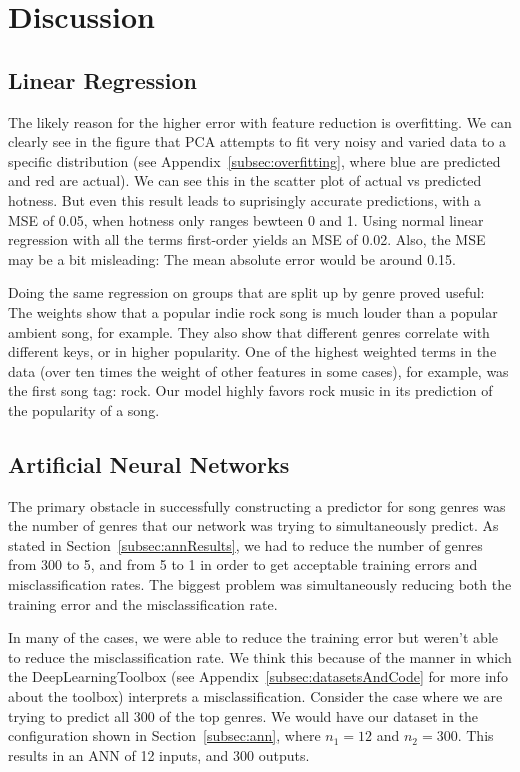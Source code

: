 \documentclass[12pt]{article}
\begin{document}
\section{Discussion}
\label{sec:discussion}

\subsection{Linear Regression}
\label{subsec:linearRegressionDisc}
The likely reason for the higher error with feature reduction is overfitting. We can clearly see in the figure that PCA attempts to fit very noisy and varied data to a specific distribution (see Appendix~\ref{subsec:overfitting}, where blue are predicted and red are actual). We can see this in the scatter plot of actual vs predicted hotness. But even this result leads to suprisingly accurate predictions, with a MSE of 0.05, when hotness only ranges bewteen 0 and 1. Using normal linear regression with all the terms first-order yields an MSE of 0.02.  Also, the MSE may be a bit misleading: The mean absolute error would be around 0.15. 

Doing the same regression on groups that are split up by genre proved useful: The weights show that a popular indie rock song is much louder than a popular ambient song, for example. They also show that different genres correlate with different keys, or in higher popularity. One of the highest weighted terms in the data (over ten times the weight of other features in some cases), for example, was the first song tag: rock. Our model highly favors rock music in its prediction of the popularity of a song.
\subsection{Artificial Neural Networks}
\label{subsec:annDisc}
The primary obstacle in successfully constructing a predictor for song genres was the number of genres that our network was trying to simultaneously predict. As stated in Section~\ref{subsec:annResults}, we had to reduce the number of genres from 300 to 5, and from 5 to 1 in order to get acceptable training errors and misclassification rates. The biggest problem was simultaneously reducing both the training error and the misclassification rate. 

In many of the cases, we were able to reduce the training error but weren't able to reduce the misclassification rate. We think this because of the manner in which the DeepLearningToolbox (see Appendix~\ref{subsec:datasetsAndCode} for more info about the toolbox) interprets a misclassification. Consider the case where we are trying to predict all 300 of the top genres. We would have our dataset in the configuration shown in Section~\ref{subsec:ann}, where $n_1 = 12$ and $n_2 = 300$. This results in an ANN of 12 inputs, and 300 outputs. 
\end{document}
